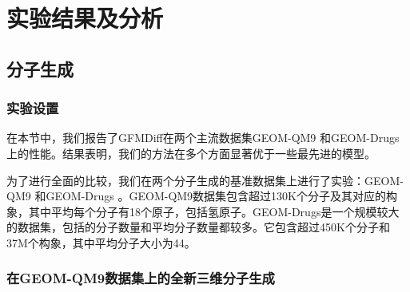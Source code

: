 \chapter{实验结果及分析}
\label{chap:experiment}

\section{分子生成}

\subsection{实验设置}
在本节中，我们报告了GFMDiff在两个主流数据集GEOM-QM9 \cite{qm9_ramakrishnan_14}和GEOM-Drugs \cite{drugs_axelrod_22}上的性能。结果表明，我们的方法在多个方面显著优于一些最先进的模型。

为了进行全面的比较，我们在两个分子生成的基准数据集上进行了实验：GEOM-QM9 \cite{qm9_ramakrishnan_14}和GEOM-Drugs \cite{drugs_axelrod_22}。GEOM-QM9数据集包含超过130K个分子及其对应的构象，其中平均每个分子有18个原子，包括氢原子。GEOM-Drugs是一个规模较大的数据集，包括的分子数量和平均分子数量都较多。它包含超过450K个分子和37M个构象，其中平均分子大小为44。

\subsection{在GEOM-QM9数据集上的全新三维分子生成}


